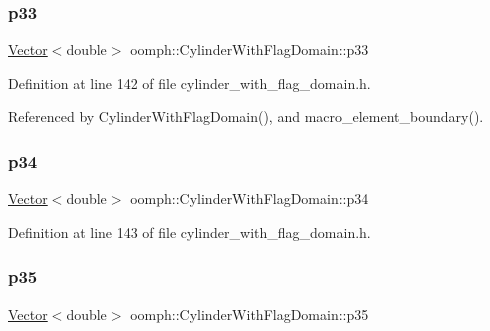 \subsubsection{\texorpdfstring{p33}{p33}}
{\footnotesize\ttfamily \hyperlink{classoomph_1_1Vector}{Vector}$<$double$>$ oomph\+::\+Cylinder\+With\+Flag\+Domain\+::p33\hspace{0.3cm}{\ttfamily [private]}}



Definition at line 142 of file cylinder\+\_\+with\+\_\+flag\+\_\+domain.\+h.



Referenced by Cylinder\+With\+Flag\+Domain(), and macro\+\_\+element\+\_\+boundary().

\mbox{\label{classoomph_1_1CylinderWithFlagDomain_a44aa94c4106c3f2d7c7575a50a56a98c}} 
\subsubsection{\texorpdfstring{p34}{p34}}
{\footnotesize\ttfamily \hyperlink{classoomph_1_1Vector}{Vector}$<$double$>$ oomph\+::\+Cylinder\+With\+Flag\+Domain\+::p34\hspace{0.3cm}{\ttfamily [private]}}



Definition at line 143 of file cylinder\+\_\+with\+\_\+flag\+\_\+domain.\+h.

\mbox{\label{classoomph_1_1CylinderWithFlagDomain_afba63042c55f44d17628aaa0623e97b8}} 
\subsubsection{\texorpdfstring{p35}{p35}}
{\footnotesize\ttfamily \hyperlink{classoomph_1_1Vector}{Vector}$<$double$>$ oomph\+::\+Cylinder\+With\+Flag\+Domain\+::p35\hspace{0.3cm}{\ttfamily [private]}}



